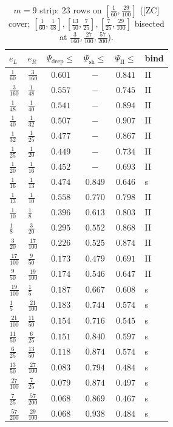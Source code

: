 \begin{table}[p]\centering\small
\caption{$m=9$ strip: $23$ rows on $[\tfrac1{60},\tfrac{29}{100}]$ ([ZC] cover; $[\tfrac1{60},\tfrac1{48}],[\tfrac{13}{50},\tfrac7{25}],[\tfrac7{25},\tfrac{29}{100}]$ bisected at $\tfrac3{160},\tfrac{27}{100},\tfrac{57}{200}$).}\label{zc9:tab:m9}
\begin{tabular}{llcccl}\toprule
$e_L$&$e_R$&$\Psi_{\mathrm{deep}}\!\le$&$\Psi_{\mathrm{sh}}\!\le$&$\Psi_{\mathrm{II}}\!\le$&bind\\\midrule
$\tfrac{1}{60}$&$\tfrac{3}{160}$&$0.601$&$-$&$0.841$&II\\
$\tfrac{3}{160}$&$\tfrac{1}{48}$&$0.557$&$-$&$0.745$&II\\
$\tfrac{1}{48}$&$\tfrac{1}{40}$&$0.541$&$-$&$0.894$&II\\
$\tfrac{1}{40}$&$\tfrac{1}{32}$&$0.507$&$-$&$0.907$&II\\
$\tfrac{1}{32}$&$\tfrac{1}{25}$&$0.477$&$-$&$0.867$&II\\
$\tfrac{1}{25}$&$\tfrac{1}{20}$&$0.449$&$-$&$0.734$&II\\
$\tfrac{1}{20}$&$\tfrac{1}{16}$&$0.452$&$-$&$0.693$&II\\
$\tfrac{1}{16}$&$\tfrac{1}{13}$&$0.474$&$0.849$&$0.646$&s\\
$\tfrac{1}{13}$&$\tfrac{1}{10}$&$0.558$&$0.770$&$0.798$&II\\
$\tfrac{1}{10}$&$\tfrac{1}{8}$&$0.396$&$0.613$&$0.803$&II\\
$\tfrac{1}{8}$&$\tfrac{3}{20}$&$0.295$&$0.552$&$0.868$&II\\
$\tfrac{3}{20}$&$\tfrac{17}{100}$&$0.226$&$0.525$&$0.874$&II\\
$\tfrac{17}{100}$&$\tfrac{9}{50}$&$0.173$&$0.479$&$0.691$&II\\
$\tfrac{9}{50}$&$\tfrac{19}{100}$&$0.174$&$0.546$&$0.647$&II\\
$\tfrac{19}{100}$&$\tfrac{1}{5}$&$0.187$&$0.667$&$0.608$&s\\
$\tfrac{1}{5}$&$\tfrac{21}{100}$&$0.183$&$0.744$&$0.574$&s\\
$\tfrac{21}{100}$&$\tfrac{11}{50}$&$0.154$&$0.716$&$0.545$&s\\
$\tfrac{11}{50}$&$\tfrac{6}{25}$&$0.151$&$0.840$&$0.597$&s\\
$\tfrac{6}{25}$&$\tfrac{13}{50}$&$0.118$&$0.874$&$0.574$&s\\
$\tfrac{13}{50}$&$\tfrac{27}{100}$&$0.083$&$0.794$&$0.484$&s\\
$\tfrac{27}{100}$&$\tfrac{7}{25}$&$0.079$&$0.874$&$0.497$&s\\
$\tfrac{7}{25}$&$\tfrac{57}{200}$&$0.068$&$0.869$&$0.467$&s\\
$\tfrac{57}{200}$&$\tfrac{29}{100}$&$0.068$&$0.938$&$0.484$&s\\
\bottomrule\end{tabular}\end{table}
